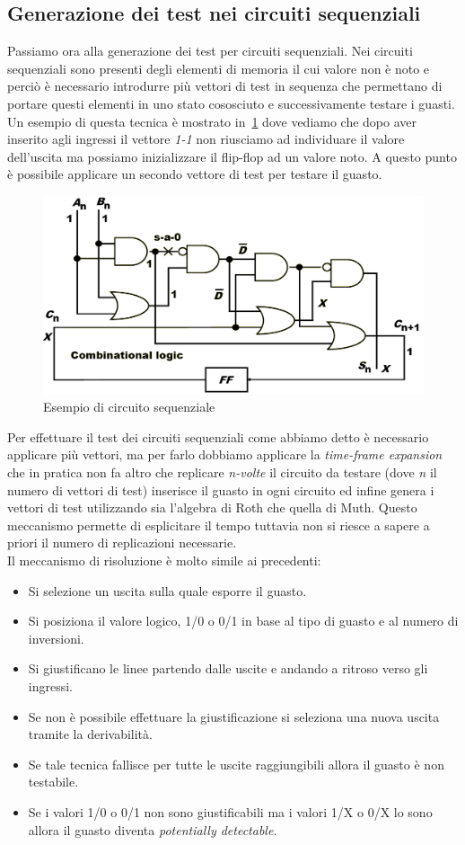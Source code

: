 \subsection{Generazione dei test nei circuiti sequenziali}
Passiamo ora alla generazione dei test per circuiti sequenziali. Nei circuiti sequenziali sono presenti degli elementi di memoria il cui valore non è noto e perciò è necessario introdurre più vettori di test in sequenza che permettano di portare questi elementi in uno stato cososciuto e successivamente testare i guasti. Un esempio di questa tecnica è mostrato in \figurename\,\ref{fig:seqexemp} dove vediamo che dopo aver inserito agli ingressi il vettore \emph{1-1} non riusciamo ad individuare il valore dell'uscita ma possiamo inizializzare il flip-flop ad un valore noto. A questo punto è possibile applicare un secondo vettore di test per testare il guasto.
\begin{figure}
\centering
\includegraphics[scale=0.4]{img/seqexemp.png}
\caption{Esempio di circuito sequenziale}\label{fig:seqexemp}
\end{figure}
Per effettuare il test dei circuiti sequenziali come abbiamo detto è necessario applicare più vettori, ma per farlo dobbiamo applicare la \emph{time-frame expansion} che in pratica non fa altro che replicare \emph{n-volte} il circuito da testare (dove \emph{n} il numero di vettori di test) inserisce il guasto in ogni circuito ed infine genera i vettori di test utilizzando sia l'algebra di Roth che quella di Muth. Questo meccanismo permette di esplicitare il tempo tuttavia non si riesce a sapere a priori il numero di replicazioni necessarie.\\
Il meccanismo di risoluzione è molto simile ai precedenti:
\begin{itemize}
\item Si selezione un uscita sulla quale esporre il guasto.
\item Si posiziona il valore logico, 1/0 o 0/1 in base al tipo di guasto e al numero di inversioni.
\item Si giustificano le linee partendo dalle uscite e andando a ritroso verso gli ingressi.
\item Se non è possibile effettuare la giustificazione si seleziona una nuova uscita tramite la derivabilità.
\item Se tale tecnica fallisce per tutte le uscite raggiungibili allora il guasto è non testabile.
\item Se i valori 1/0 o 0/1 non sono giustificabili ma i valori 1/X o 0/X lo sono allora il guasto diventa \emph{potentially detectable}.
\end{itemize}
